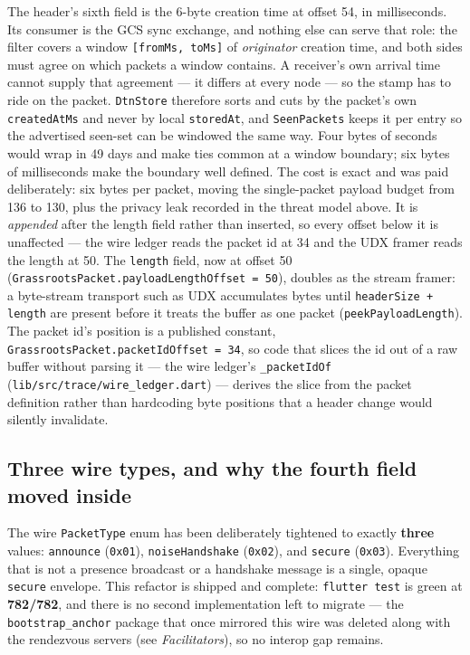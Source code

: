 \documentclass[11pt]{report}
\newcommand{\code}[1]{\texttt{\small #1}}
\begin{document}
The header's sixth field is the 6-byte creation time at offset 54, in milliseconds. Its consumer is the GCS sync exchange, and nothing else can serve that role: the filter covers a window \code{[fromMs, toMs]} of \emph{originator} creation time, and both sides must agree on which packets a window contains. A receiver's own arrival time cannot supply that agreement --- it differs at every node --- so the stamp has to ride on the packet. \code{DtnStore} therefore sorts and cuts by the packet's own \code{createdAtMs} and never by local \code{storedAt}, and \code{SeenPackets} keeps it per entry so the advertised seen-set can be windowed the same way. Four bytes of seconds would wrap in 49 days and make ties common at a window boundary; six bytes of milliseconds make the boundary well defined. The cost is exact and was paid deliberately: six bytes per packet, moving the single-packet payload budget from 136 to 130, plus the privacy leak recorded in the threat model above. It is \emph{appended} after the length field rather than inserted, so every offset below it is unaffected --- the wire ledger reads the packet id at 34 and the UDX framer reads the length at 50. The \code{length} field, now at offset 50 (\code{GrassrootsPacket.payloadLengthOffset = 50}), doubles as the stream framer: a byte-stream transport such as UDX accumulates bytes until \code{headerSize + length} are present before it treats the buffer as one packet (\code{peekPayloadLength}). The packet id's position is a published constant, \code{GrassrootsPacket.packetIdOffset = 34}, so code that slices the id out of a raw buffer without parsing it --- the wire ledger's \code{\_packetIdOf} (\code{lib/src/trace/wire\_ledger.dart}) --- derives the slice from the packet definition rather than hardcoding byte positions that a header change would silently invalidate.

\subsection*{Three wire types, and why the fourth field moved inside}

The wire \code{PacketType} enum has been deliberately tightened to exactly \textbf{three} values: \code{announce} (\code{0x01}), \code{noiseHandshake} (\code{0x02}), and \code{secure} (\code{0x03}). Everything that is not a presence broadcast or a handshake message is a single, opaque \code{secure} envelope. This refactor is shipped and complete: \code{flutter test} is green at \textbf{782/782}, and there is no second implementation left to migrate — the \code{bootstrap\_anchor} package that once mirrored this wire was deleted along with the rendezvous servers (see \emph{Facilitators}), so no interop gap remains.
\end{document}
